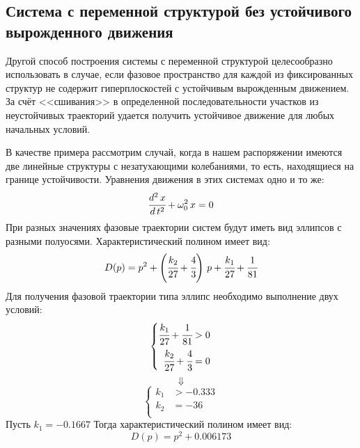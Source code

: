 \clearpage
\subsection{Система с переменной структурой без устойчивого вырожденного движения} \label{title:VSS_no_SDM}
Другой способ построения системы с переменной структурой целесообразно использовать в случае, если фазовое пространство  для каждой из фиксированных структур не содержит гиперплоскостей с устойчивым вырожденным движением. За счёт <<сшивания>> в определенной последовательности участков из неустойчивых траекторий удается получить устойчивое движение для любых начальных условий.

В качестве примера рассмотрим случай, когда в нашем распоряжении имеются две линейные структуры с незатухающими колебаниями, то есть,  находящиеся на границе устойчивости. Уравнения движения в этих системах одно и то же:
\begin{equation} \label{eq:HP_centr}
\cfrac{d^2\,x}{d\,t^2}+\omega_0^2\,x=0
\end{equation}
При разных значениях   фазовые траектории систем  будут иметь вид эллипсов с разными полуосями. Характеристический полином имеет вид:
\begin{equation} \label{eq:HP_centr}
D(p)=p^2+\left(\cfrac{k_{2}}{27}+\cfrac{4}{3}\right)\,p+\cfrac{k_{1}}{27}+\cfrac{1}{81}
\end{equation}
Для получения фазовой траектории типа эллипс необходимо выполнение двух условий:
\begin{equation}
    \left\{
    \begin{aligned} \label{eq:usl_centr1}
       \cfrac{k_{1}}{27}+\cfrac{1}{81}&>0\\
       \cfrac{k_{2}}{27}+\cfrac{4}{3}&=0\\
    \end{aligned}
    \right.
\end{equation}
\begin{equation} \label{eq:}
\Downarrow
\end{equation}
\begin{equation}
    \left\{
    \begin{aligned} \label{eq:usl_centr2}
       k_1&>-0.333\\
       k_2&=-36\\
    \end{aligned}
    \right.
\end{equation}
Пусть $k_1=-0.1667$
Тогда характеристический полином имеет вид:
\begin{equation} \label{eq:elips1}
D(p)=p^2+0.006173
\end{equation}
